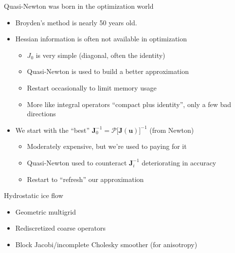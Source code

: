 \documentclass{beamer}
\newcommand{\vu}{\mathbf{u}}
\newcommand{\vJ}{\mathbf{J}}
\begin{document}
\begin{frame}{Quasi-Newton was born in the optimization world}
  \begin{itemize}
  \item Broyden's method is nearly 50 years old.
  \item Hessian information is often not available in optimization
    \begin{itemize}
    \item $J_0$ is very simple (diagonal, often the identity)
    \item Quasi-Newton is used to build a better approximation
    \item Restart occasionally to limit memory usage
    \item More like integral operators ``compact plus identity'', only a few bad directions
    \end{itemize}
  \item We start with the ``best''  $\vJ_0^{-1} = \mathcal{P}\big[\vJ(\vu)\big]^{-1}$ (from Newton)
    \begin{itemize}
    \item Moderately expensive, but we're used to paying for it
    \item Quasi-Newton used to counteract $\vJ_i^{-1}$ deteriorating in accuracy
    \item Restart to ``refresh'' our approximation
    \end{itemize}
  \end{itemize}
\end{frame}


\begin{frame}{Hydrostatic ice flow}
  \begin{itemize}
  \item Geometric multigrid
  \item Rediscretized coarse operators
  \item Block Jacobi/incomplete Cholesky smoother (for anisotropy)
  \end{itemize}
\end{frame}
\end{document}

